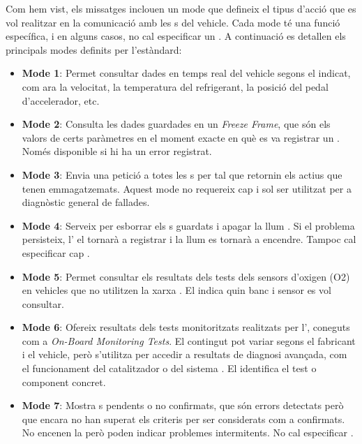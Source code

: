 \documentclass{tfgitic}[2024/07/01]
\begin{document}
Com hem vist, els missatges  inclouen un mode que defineix el tipus d'acció que es vol realitzar en la comunicació amb les s del vehicle. 
Cada mode té una funció específica, i en alguns casos, no cal especificar un . A continuació es detallen els principals modes 
definits per l'estàndard:

\begin{itemize}
  \item \textbf{Mode 1}: Permet consultar dades en temps real del vehicle segons el  indicat, com ara la velocitat, la temperatura del refrigerant, 
  la posició del pedal d'accelerador, etc.
  
  \item \textbf{Mode 2}: Consulta les dades guardades en un \textit{Freeze Frame}, que són els valors de certs paràmetres en el moment exacte en què es va 
  registrar un . Només disponible si hi ha un error registrat.
  
  \item \textbf{Mode 3}: Envia una petició a totes les s per tal que retornin els  actius que tenen emmagatzemats. Aquest mode no requereix 
  cap  i sol ser utilitzat per a diagnòstic general de fallades.
  
  \item \textbf{Mode 4}: Serveix per esborrar els s guardats i apagar la llum . Si el problema persisteix, l' el tornarà a 
  registrar i la llum es tornarà a encendre. Tampoc cal especificar cap .
  
  \item \textbf{Mode 5}: Permet consultar els resultats dels tests dels sensors d'oxigen (O2) en vehicles que no utilitzen la xarxa . El  
  indica quin banc i sensor es vol consultar.

  \item \textbf{Mode 6}: Ofereix resultats dels tests monitoritzats realitzats per l', coneguts com a \textit{On-Board Monitoring Tests}. El contingut 
  pot variar segons el fabricant i el vehicle, però s'utilitza per accedir a resultats de diagnosi avançada, com el funcionament del catalitzador 
  o del sistema . El  identifica el test o component concret.
  
  \item \textbf{Mode 7}: Mostra s pendents o no confirmats, que són errors detectats però que encara no han superat els criteris per ser considerats 
  com a confirmats. No encenen la  però poden indicar problemes intermitents. No cal especificar .
  

\end{itemize}
\end{document}
